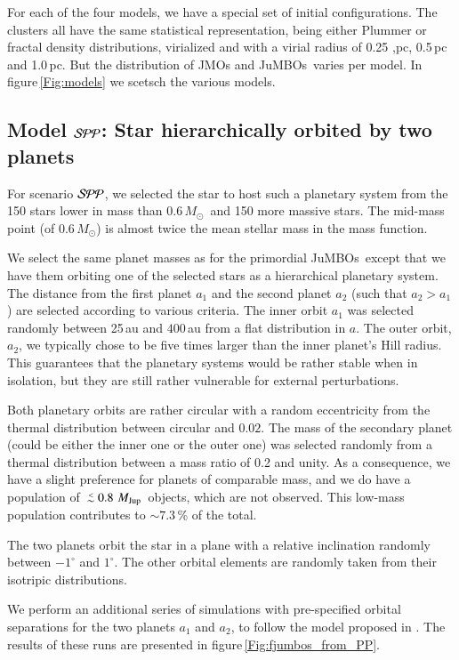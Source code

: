 \documentclass[submission,phys]{lib/SciPost}
\newcommand{\MSun}{\mbox{${M}_\odot$}}
\newcommand{\MJup}{\mbox{${M}_{\rm Jup}$}}
\def\aplt{\ {\raise-.5ex\hbox{$\buildrel<\over\sim$}}\ }
\newcommand{\jumbos}{\mbox{JuMBOs}}
\begin{document}
For each of the four models, we have a special set of initial
configurations. The clusters all have the same statistical
representation, being either Plummer or fractal density distributions,
virialized and with a virial radius of 0.25 ,pc, 0.5\,pc and
1.0\,pc. But the distribution of JMOs and \jumbos\, varies per model.
In figure\,\ref{Fig:models} we scetsch the various models.

\subsection{Model ${\cal SPP}$: Star hierarchically orbited by two planets}

For scenario ${\cal SPP}$, we selected the star to host such a
planetary system from the 150 stars lower in mass than 0.6\,\MSun\,
and 150 more massive stars. The mid-mass point (of 0.6\,\MSun) is
almost twice the mean stellar mass in the mass function.

We select the same planet masses as for the primordial \jumbos\,
except that we have them orbiting one of the selected stars as a
hierarchical planetary system. The distance from the first planet
$a_1$ and the second planet $a_2$ (such that $a_2>a_1$) are selected
according to various criteria.  The inner orbit $a_1$ was selected
randomly between 25\,au and $400$\,au from a flat distribution in $a$.
The outer orbit, $a_2$, we typically chose to be five times larger
than the inner planet's Hill radius.  This guarantees that the
planetary systems would be rather stable when in isolation, but they
are still rather vulnerable for external perturbations.

Both planetary orbits are rather circular with a random eccentricity
from the thermal distribution between circular and $0.02$.  The mass
of the secondary planet (could be either the inner one or the outer
one) was selected randomly from a thermal distribution between a mass
ratio of 0.2 and unity. As a consequence, we have a slight preference
for planets of comparable mass, and we do have a population of $\aplt
0.8$\,\MJup\, objects, which are not observed.  This low-mass
population contributes to $\sim 7.3$\,\% of the total.

The two planets orbit the star in a plane with a relative inclination
randomly between $-1^\circ$ and $1^\circ$. The other orbital elements
are randomly taken from their isotripic distributions.

We perform an additional series of simulations with pre-specified
orbital separations for the two planets $a_1$ and $a_2$, to follow the
model proposed in \cite{2023arXiv231006016W}. The results of these
runs are presented in figure\,\ref{Fig:fjumbos_from_PP}.
\end{document}
